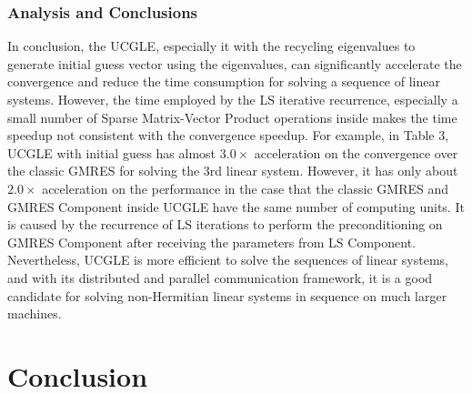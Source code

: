 \subsubsection{Analysis and Conclusions}

In conclusion, the UCGLE, especially it with the recycling eigenvalues to generate initial guess vector using the eigenvalues, can significantly accelerate the convergence and reduce the time consumption for solving a sequence of linear systems. However, the time employed by the LS iterative recurrence, especially a small number of Sparse Matrix-Vector Product operations inside makes the time speedup not consistent with the convergence speedup. For example, in Table 3, UCGLE with initial guess has almost $3.0 \times$ acceleration on the convergence over the classic GMRES for solving the 3rd linear system. However, it has only about $2.0 \times$ acceleration on the performance in the case that the classic GMRES and GMRES Component inside UCGLE have the same number of computing units. It is caused by the recurrence of LS iterations to perform the preconditioning on GMRES Component after receiving the parameters from LS Component. Nevertheless, UCGLE is more efficient to solve the sequences of linear systems, and with its distributed and parallel communication framework, it is a good candidate for solving non-Hermitian linear systems in sequence on much larger machines.

\section{Conclusion}

\clearemptydoublepage